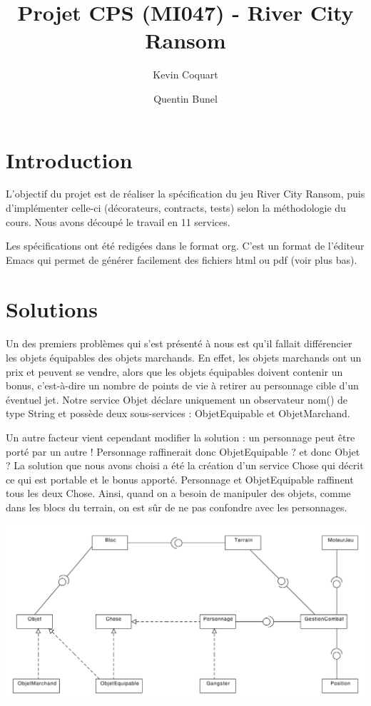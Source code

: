 \documentclass[a4paper,titlepage,openany,12pt]{report}
\title{Projet CPS (MI047) - River City Ransom}
\author{Kevin Coquart \and Quentin Bunel}
\begin{document}
\maketitle

\section*{Introduction}

L'objectif du projet est de réaliser la spécification du jeu River City Ransom,
puis d'implémenter celle-ci (décorateurs, contracts, tests) selon la méthodologie du cours.
Nous avons découpé le travail en 11 services.

Les spécifications ont été redigées dans le format org. C'est un format de l'éditeur Emacs
qui permet de générer facilement des fichiers html ou pdf (voir plus bas).

\section*{Solutions}

\paragraph{}
Un des premiers problèmes qui s'est présenté à nous est qu'il fallait différencier les objets équipables
des objets marchands. En effet, les objets marchands ont un prix et peuvent se vendre, alors que les objets 
équipables doivent contenir un bonus, c'est-à-dire un nombre de points de vie à retirer au personnage cible 
d'un éventuel jet. Notre service Objet déclare uniquement un observateur nom() de type String et possède deux 
sous-services : ObjetEquipable et ObjetMarchand.

Un autre facteur vient cependant modifier la solution : un personnage peut être porté par un autre !
Personnage raffinerait donc ObjetEquipable ? et donc Objet ?
La solution que nous avons choisi a été la création d'un service Chose qui décrit ce qui est portable et 
le bonus apporté. Personnage et ObjetEquipable raffinent tous les deux Chose.
Ainsi, quand on a besoin de manipuler des objets, comme dans les blocs du terrain, on est sûr de ne pas
confondre avec les personnages.

\begin{landscape}  %
  \includegraphics[width=24cm]{../presentation/diagProjetCPS}
\end{landscape}
\end{document}

